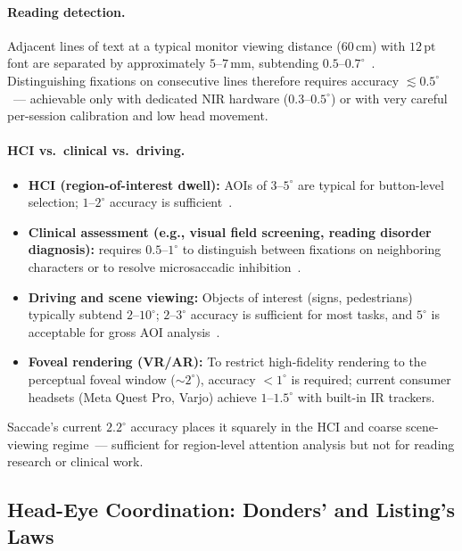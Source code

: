 \documentclass[11pt,a4paper]{article}
\begin{document}
\paragraph{Reading detection.}
Adjacent lines of text at a typical monitor viewing distance ($60\,\text{cm}$) with $12\,\text{pt}$ font are separated by approximately $5$--$7\,\text{mm}$, subtending $0.5$--$0.7^\circ$~\cite{rayner1998eye}.
Distinguishing fixations on consecutive lines therefore requires accuracy $\lesssim 0.5^\circ$~--- achievable only with dedicated NIR hardware ($0.3$--$0.5^\circ$) or with very careful per-session calibration and low head movement.

\paragraph{HCI vs.\ clinical vs.\ driving.}
\begin{itemize}
  \item \textbf{HCI (region-of-interest dwell):} AOIs of $3$--$5^\circ$ are typical for button-level selection; $1$--$2^\circ$ accuracy is sufficient~\cite{kar2017review}.
  \item \textbf{Clinical assessment (e.g., visual field screening, reading disorder diagnosis):} requires $0.5$--$1^\circ$ to distinguish between fixations on neighboring characters or to resolve microsaccadic inhibition~\cite{leigh2015neurology}.
  \item \textbf{Driving and scene viewing:} Objects of interest (signs, pedestrians) typically subtend $2$--$10^\circ$; $2$--$3^\circ$ accuracy is sufficient for most tasks, and $5^\circ$ is acceptable for gross AOI analysis~\cite{holmqvist2011eye}.
  \item \textbf{Foveal rendering (VR/AR):} To restrict high-fidelity rendering to the perceptual foveal window (${\sim}2^\circ$), accuracy $<1^\circ$ is required; current consumer headsets (Meta Quest Pro, Varjo) achieve $1$--$1.5^\circ$ with built-in IR trackers.
\end{itemize}

Saccade's current $2.2^\circ$ accuracy places it squarely in the HCI and coarse scene-viewing regime~--- sufficient for region-level attention analysis but not for reading research or clinical work.

\subsection{Head-Eye Coordination: Donders' and Listing's Laws}
\end{document}
